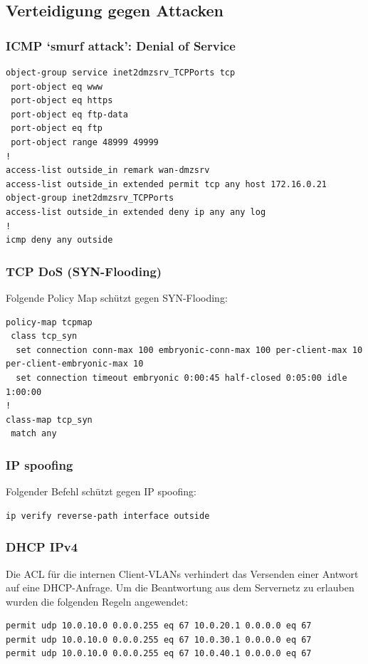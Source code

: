 \documentclass[11pt,a4paper,parskip=half]{scrartcl}
\begin{document}
\subsection{Verteidigung gegen Attacken}
\subsubsection{ICMP ‘smurf attack’: Denial of Service}
\begin{lstlisting}
object-group service inet2dmzsrv_TCPPorts tcp
 port-object eq www
 port-object eq https
 port-object eq ftp-data
 port-object eq ftp
 port-object range 48999 49999
!
access-list outside_in remark wan-dmzsrv
access-list outside_in extended permit tcp any host 172.16.0.21 object-group inet2dmzsrv_TCPPorts
access-list outside_in extended deny ip any any log
!
icmp deny any outside
\end{lstlisting}

\subsubsection{TCP DoS (SYN-Flooding)}
Folgende Policy Map schützt gegen SYN-Flooding:
\begin{lstlisting}
policy-map tcpmap
 class tcp_syn
  set connection conn-max 100 embryonic-conn-max 100 per-client-max 10 per-client-embryonic-max 10
  set connection timeout embryonic 0:00:45 half-closed 0:05:00 idle 1:00:00
!
class-map tcp_syn
 match any
\end{lstlisting}

\subsubsection{IP spoofing}
Folgender Befehl schützt gegen IP spoofing:
\begin{lstlisting}
ip verify reverse-path interface outside
\end{lstlisting}

\subsubsection{DHCP IPv4}
Die ACL für die internen Client-VLANs verhindert das Versenden einer Antwort auf eine DHCP-Anfrage. Um die Beantwortung aus dem Servernetz zu erlauben wurden die folgenden Regeln angewendet:

\begin{lstlisting}
permit udp 10.0.10.0 0.0.0.255 eq 67 10.0.20.1 0.0.0.0 eq 67
permit udp 10.0.10.0 0.0.0.255 eq 67 10.0.30.1 0.0.0.0 eq 67
permit udp 10.0.10.0 0.0.0.255 eq 67 10.0.40.1 0.0.0.0 eq 67
\end{lstlisting}
\end{document}
